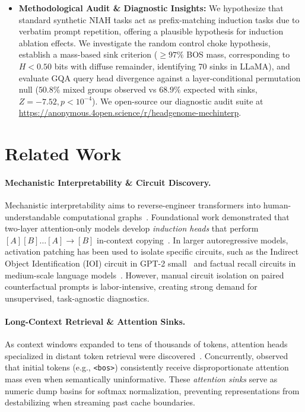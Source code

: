 \documentclass[11pt]{article}
\begin{document}
\begin{itemize}
    \item \textbf{Methodological Audit \& Diagnostic Insights:} We hypothesize that standard synthetic NIAH tasks act as prefix-matching induction tasks due to verbatim prompt repetition, offering a plausible hypothesis for induction ablation effects. We investigate the random control choke hypothesis, establish a mass-based sink criterion ($\ge 97\%$ BOS mass, corresponding to $H < 0.50$ bits with diffuse remainder, identifying 70 sinks in LLaMA), and evaluate GQA query head divergence against a layer-conditional permutation null ($50.8\%$ mixed groups observed vs $68.9\%$ expected with sinks, $Z = -7.52, p < 10^{-4}$). We open-source our diagnostic audit suite at \url{https://anonymous.4open.science/r/headgenome-mechinterp}.
\end{itemize}

\section{Related Work}
\label{sec:related}

\paragraph{Mechanistic Interpretability \& Circuit Discovery.}
Mechanistic interpretability aims to reverse-engineer transformers into human-understandable computational graphs~\cite{elhage2021mathematical}. Foundational work demonstrated that two-layer attention-only models develop \textit{induction heads} that perform $[A][B] \dots [A] \to [B]$ in-context copying~\cite{olsson2022incontext}. In larger autoregressive models, activation patching has been used to isolate specific circuits, such as the Indirect Object Identification (IOI) circuit in GPT-2 small~\cite{wang2023ioi} and factual recall circuits in medium-scale language models~\cite{geva2023dissecting}. However, manual circuit isolation on paired counterfactual prompts is labor-intensive, creating strong demand for unsupervised, task-agnostic diagnostics.

\paragraph{Long-Context Retrieval \& Attention Sinks.}
As context windows expanded to tens of thousands of tokens, attention heads specialized in distant token retrieval were discovered~\cite{wu2024retrieval,kamradt2023pressure}. Concurrently, \citet{xiao2023streamingllm} observed that initial tokens (e.g., \texttt{<bos>}) consistently receive disproportionate attention mass even when semantically uninformative. These \textit{attention sinks} serve as numeric dump basins for softmax normalization, preventing representations from destabilizing when streaming past cache boundaries.
\end{document}
